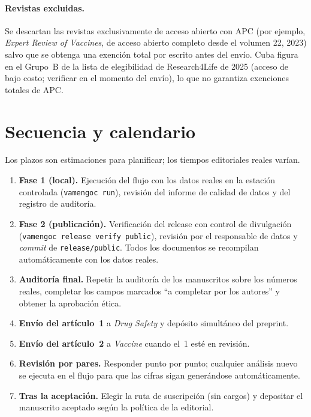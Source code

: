 \documentclass[11pt]{article}
\begin{document}
\paragraph{Revistas excluidas.} Se descartan las revistas exclusivamente de acceso abierto con APC
(por ejemplo, \emph{Expert Review of Vaccines}, de acceso abierto completo desde el volumen 22,
2023) salvo que se obtenga una exención total por escrito antes del envío. Cuba figura en el
Grupo~B de la lista de elegibilidad de Research4Life de 2025 (acceso de bajo costo; verificar en el momento del envío), lo que no garantiza exenciones totales de APC.

\section{Secuencia y calendario}
Los plazos son estimaciones para planificar; los tiempos editoriales reales varían.
\begin{enumerate}[leftmargin=*]
\item \textbf{Fase 1 (local).} Ejecución del flujo con los datos reales en la estación controlada
  (\texttt{vamengoc run}), revisión del informe de calidad de datos y del registro de auditoría.
\item \textbf{Fase 2 (publicación).} Verificación del release con control de divulgación
  (\texttt{vamengoc release verify public}), revisión por el responsable de datos y \emph{commit}
  de \nolinkurl{release/public}. Todos los documentos se recompilan automáticamente con los datos reales.
\item \textbf{Auditoría final.} Repetir la auditoría de los manuscritos sobre los números reales,
  completar los campos marcados ``a completar por los autores'' y obtener la aprobación ética.
\item \textbf{Envío del artículo~1} a \emph{Drug Safety} y depósito simultáneo del preprint.
\item \textbf{Envío del artículo~2} a \emph{Vaccine} cuando el~1 esté en revisión.
\item \textbf{Revisión por pares.} Responder punto por punto; cualquier análisis nuevo se ejecuta
  en el flujo para que las cifras sigan generándose automáticamente.
\item \textbf{Tras la aceptación.} Elegir la ruta de suscripción (sin cargos) y depositar el
  manuscrito aceptado según la política de la editorial.
\end{enumerate}
\end{document}
